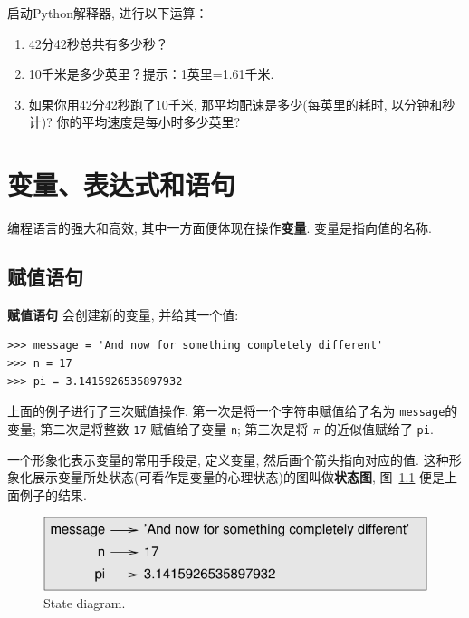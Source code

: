 \documentclass[10pt]{book}
\begin{document}
\begin{exercise}

启动Python解释器, 进行以下运算：

\begin{enumerate}

\item 42分42秒总共有多少秒？

\item 10千米是多少英里？提示：1英里=1.61千米. 

\item 如果你用42分42秒跑了10千米, 那平均配速是多少(每英里的耗时, 以分钟和秒计)?
你的平均速度是每小时多少英里?


\end{enumerate}

\end{exercise}


\chapter{变量、表达式和语句}

编程语言的强大和高效, 其中一方面便体现在操作{\bf 变量}. 
变量是指向值的名称. 


\section{赋值语句}
\label{variables}

{\bf 赋值语句} 会创建新的变量, 并给其一个值: 

\begin{verbatim}
>>> message = 'And now for something completely different'
>>> n = 17
>>> pi = 3.1415926535897932
\end{verbatim}
%
上面的例子进行了三次赋值操作. 
第一次是将一个字符串赋值给了名为 {\tt message}的变量;
第二次是将整数 {\tt 17} 赋值给了变量 {\tt n};
第三次是将 $\pi$ 的近似值赋给了 {\tt pi}. 

一个形象化表示变量的常用手段是, 定义变量, 然后画个箭头指向对应的值. 
这种形象化展示变量所处状态(可看作是变量的心理状态)的图叫做{\bf 状态图}, 
图~\ref{fig.state2} 便是上面例子的结果. 

\begin{figure}
\centerline
{\includegraphics[scale=0.8]{figs/state2.pdf}}
\caption{State diagram.}
\label{fig.state2}
\end{figure}
\end{document}
